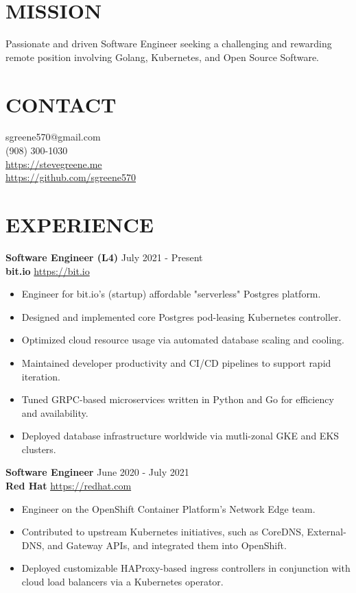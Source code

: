 \documentclass[line, margin, 10.5pt]{res}
\begin{document}

\begin{resume}

\section{\small MISSION}
Passionate and driven Software Engineer seeking a challenging and rewarding remote position involving Golang, Kubernetes, and Open Source Software.

\section{\small CONTACT}
sgreene570@gmail.com \\
(908) 300-1030 \\
\url{https://stevegreene.me} \\
\url{https://github.com/sgreene570}

\section{\small EXPERIENCE}
{\bf \large{Software Engineer (L4)}} \hfill July 2021 - Present \\
{\bf bit.io} \hfill \url{https://bit.io}
\begin{itemize}
    \item Engineer for bit.io's (startup) affordable "serverless" Postgres platform.
    \item Designed and implemented core Postgres pod-leasing Kubernetes controller.
    \item Optimized cloud resource usage via automated database scaling and cooling.
    \item Maintained developer productivity and CI/CD pipelines to support rapid iteration.
    \item Tuned GRPC-based microservices written in Python and Go for efficiency and availability.
    \item Deployed database infrastructure worldwide via mutli-zonal GKE and EKS clusters.
\end{itemize}

{\bf \large{Software Engineer}} \hfill June 2020 - July 2021 \\
{\bf Red Hat} \hfill \url{https://redhat.com}
\begin{itemize}
    \item Engineer on the OpenShift Container Platform's Network Edge team.
    \item Contributed to upstream Kubernetes initiatives, such as CoreDNS, External-DNS, and Gateway APIs, and integrated them into OpenShift.
    \item Deployed customizable HAProxy-based ingress controllers in conjunction with cloud load balancers via a Kubernetes operator.
\end{itemize}


\end{resume}
\end{document}
